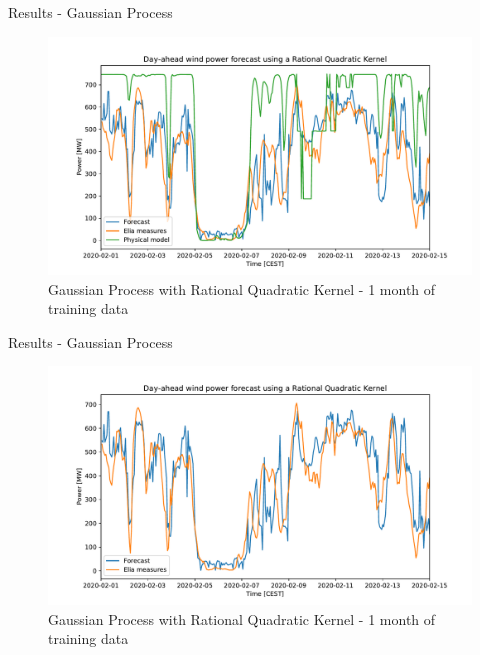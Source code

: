 \documentclass[12pt]{beamer}
\begin{document}
\begin{frame}{Results - Gaussian Process}
    \begin{figure}
        \centering
        \includegraphics[width=\textwidth]{resources/pdf/dawpf_rqk_2b.pdf}
        \caption{Gaussian Process with Rational Quadratic Kernel - 1 month of training data}
    \end{figure}
\end{frame}

\begin{frame}{Results - Gaussian Process}
    \begin{figure}
        \centering
        \includegraphics[width=\textwidth]{resources/pdf/dawpf_rqk_2a.pdf}
        \caption{Gaussian Process with Rational Quadratic Kernel - 1 month of training data}
    \end{figure}
\end{frame}
\end{document}
